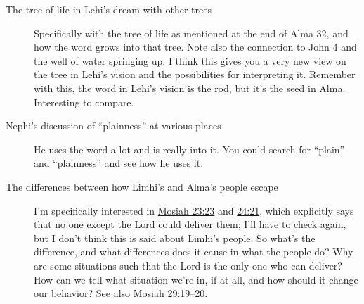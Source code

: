 \begin{description}
		\item[The tree of life in Lehi's dream with other trees]
			Specifically with the tree of life as mentioned at the end of Alma 32, and how the word grows into that tree. Note also the connection to John 4 and the well of water springing up. I think this gives you a very new view on the tree in Lehi's vision and the possibilities for interpreting it. Remember with this, the word in Lehi's vision is the rod, but it's the seed in Alma. Interesting to compare.
			
		\item[Nephi's discussion of ``plainness'' at various places]
			He uses the word a lot and is really into it. You could search for ``plain'' and ``plainness'' and see how he uses it.
			
		\item[The differences between how Limhi's and Alma's people escape]
			I'm specifically interested in \hyperref[MOSIAH-23-23]{Mosiah 23:23} and \hyperref[MOSIAH-24-21]{24:21}, which explicitly says that no one except the Lord could deliver them; I'll have to check again, but I don't think this is said about Limhi's people. So what's the difference, and what differences does it cause in what the people do? Why are some situations such that the Lord is the only one who can deliver? How can we tell what situation we're in, if at all, and how should it change our behavior? See also \hyperref[MOSIAH-29-19]{Mosiah 29:19--20}.
			

\end{description}
